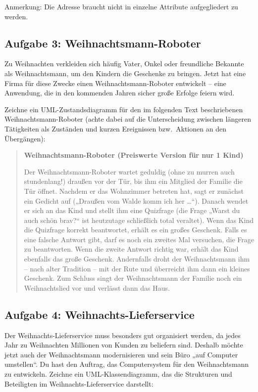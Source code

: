 Anmerkung: Die Adresse braucht nicht in einzelne Attribute aufgegliedert zu
werden.


\subsection{Aufgabe 3: Weihnachtsmann-Roboter}

Zu Weihnachten verkleiden sich häufig Vater, Onkel oder freundliche Bekannte als
Weihnachtsmann, um den Kindern die Geschenke zu bringen. Jetzt hat eine Firma
für diese Zwecke einen Weihnachtsmann-Roboter entwickelt -- eine Anwendung, die
in den kommenden Jahren sicher große Erfolge feiern wird.

Zeichne ein UML-Zustandsdiagramm für den im folgenden Text beschriebenen
Weihnachtsmann-Roboter (achte dabei auf die Unterscheidung zwischen längeren
Tätigkeiten als Zuständen und kurzen Ereignissen bzw.\ Aktionen an den
Übergängen):

\begin{quotation}
\noindent \textbf{Weihnachtsmann-Roboter (Preiswerte Version für nur 1 Kind)}

\noindent Der Weihnachtsmann-Roboter wartet geduldig (ohne zu murren auch
stundenlang!) draußen vor der Tür, bis ihm ein Mitglied der Familie die Tür
öffnet. Nachdem er das Wohnzimmer betreten hat, sagt er zunächst ein Gedicht
auf („Draußen vom Walde komm ich her \ldots“). Danach wendet er sich an das
Kind und stellt ihm eine Quizfrage (die Frage „Warst du auch schön brav?“ ist
heutzutage schließlich total veraltet). Wenn das Kind die Quizfrage korrekt
beantwortet, erhält es ein großes Geschenk. Falls es eine falsche Antwort gibt,
darf es noch ein zweites Mal versuchen, die Frage zu beantworten. Wenn die
zweite Antwort richtig war, erhält das Kind ebenfalls das große Geschenk.
Andernfalls droht der Weihnachtsmann ihm -- nach alter Tradition -- mit der
Rute und überreicht ihm dann ein kleines Geschenk. Zum Schluss singt der
Weihnachtsmann der Familie noch ein Weihnachtslied vor und verlässt dann das
Haus.
\end{quotation}


\subsection{Aufgabe 4: Weihnachts-Lieferservice}

Der Weihnachts-Lieferservice muss besonders gut organisiert werden, da jedes
Jahr zu Weihnachten Millionen von Kunden zu beliefern sind. Deshalb möchte
jetzt auch der Weihnachtsmann modernisieren und sein Büro „auf Computer
umstellen“. Du hast den Auftrag, das Computersystem für den Weihnachtsmann zu
entwickeln. Zeichne ein UML-Klassendiagramm, das die Strukturen und Beteiligten
im Weihnachts-Lieferservice darstellt:

